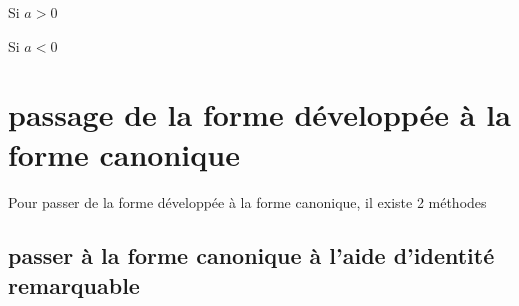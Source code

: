 	\begin{bprop}
		\begin{minipage}[c]{0.5\linewidth}
			Si $a>0$
			\ \\
			
		\end{minipage}
		\begin{minipage}[c]{0.5\linewidth}
			Si $a<0$
			\ \\
			
		\end{minipage}
	\end{bprop}

	\section{passage de la forme développée à la forme canonique}
	
	Pour passer de la forme développée à la forme canonique, il existe 2 méthodes
	
	\subsection{passer à la forme canonique à l'aide d'identité remarquable}
    
    
    
